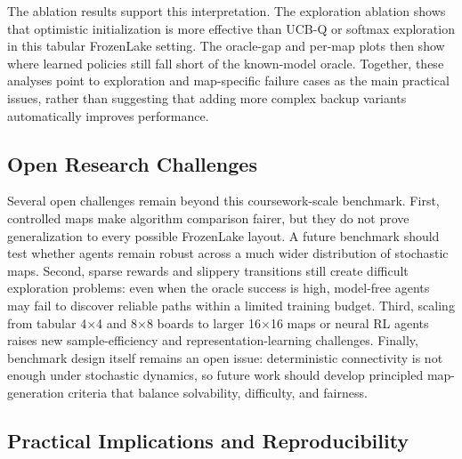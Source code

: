 \documentclass[10pt]{article}
\begin{document}
The ablation results support this interpretation. The exploration ablation shows that optimistic initialization is more effective than UCB-Q or softmax exploration in this tabular FrozenLake setting. The oracle-gap and per-map plots then show where learned policies still fall short of the known-model oracle. Together, these analyses point to exploration and map-specific failure cases as the main practical issues, rather than suggesting that adding more complex backup variants automatically improves performance.



\subsection{Open Research Challenges}

Several open challenges remain beyond this coursework-scale benchmark.
First, controlled maps make algorithm comparison fairer, but they do not prove generalization to every possible FrozenLake layout.
A future benchmark should test whether agents remain robust across a much wider distribution of stochastic maps.
Second, sparse rewards and slippery transitions still create difficult exploration problems: even when the oracle success is high, model-free agents may fail to discover reliable paths within a limited training budget.
Third, scaling from tabular 4$\times$4 and 8$\times$8 boards to larger 16$\times$16 maps or neural RL agents raises new sample-efficiency and representation-learning challenges.
Finally, benchmark design itself remains an open issue: deterministic connectivity is not enough under stochastic dynamics, so future work should develop principled map-generation criteria that balance solvability, difficulty, and fairness.

\subsection{Practical Implications and Reproducibility}
\end{document}
